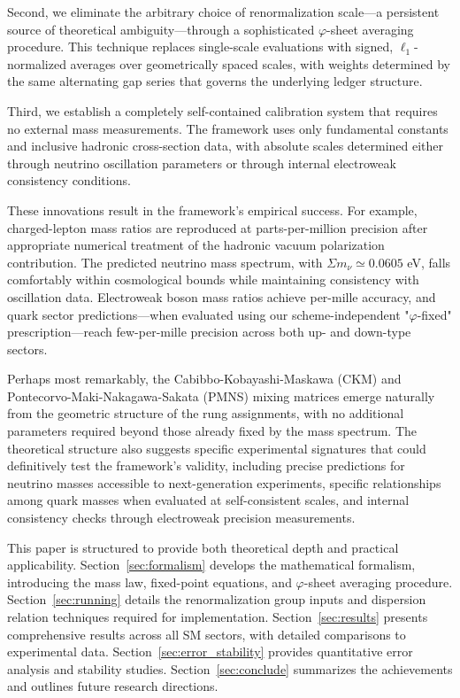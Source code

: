 \documentclass[%
amsmath,amssymb,
aps,
prb,
floatfix, showkeys, 10pt,
]{revtex4-2}
\begin{document}
Second, we eliminate the arbitrary choice of renormalization scale—a persistent source of theoretical ambiguity—through a sophisticated $\varphi$-sheet averaging procedure. This technique replaces single-scale evaluations with signed, $\ell_1$-normalized averages over geometrically spaced scales, with weights determined by the same alternating gap series that governs the underlying ledger structure.

Third, we establish a completely self-contained calibration system that requires no external mass measurements. The framework uses only fundamental constants and inclusive hadronic cross-section data, with absolute scales determined either through neutrino oscillation parameters or through internal electroweak consistency conditions.

These innovations result in the framework's empirical success. For example, charged-lepton mass ratios are reproduced at parts-per-million precision after appropriate numerical treatment of the hadronic vacuum polarization contribution. The predicted neutrino mass spectrum, with $\Sigma m_\nu \simeq 0.0605$ eV, falls comfortably within cosmological bounds while maintaining consistency with oscillation data. Electroweak boson mass ratios achieve per-mille accuracy, and quark sector predictions—when evaluated using our scheme-independent "$\varphi$-fixed" prescription—reach few-per-mille precision across both up- and down-type sectors.

Perhaps most remarkably, the Cabibbo-Kobayashi-Maskawa (CKM) and Pontecorvo-Maki-Nakagawa-Sakata (PMNS) mixing matrices emerge naturally from the geometric structure of the rung assignments, with no additional parameters required beyond those already fixed by the mass spectrum.
The theoretical structure also suggests specific experimental signatures that could definitively test the framework's validity, including precise predictions for neutrino masses accessible to next-generation experiments, specific relationships among quark masses when evaluated at self-consistent scales, and internal consistency checks through electroweak precision measurements.



This paper is structured to provide both theoretical depth and practical applicability. Section~\ref{sec:formalism} develops the mathematical formalism, introducing the mass law, fixed-point equations, and $\varphi$-sheet averaging procedure. Section~\ref{sec:running} details the renormalization group inputs and dispersion relation techniques required for implementation. Section~\ref{sec:results} presents comprehensive results across all SM sectors, with detailed comparisons to experimental data. Section~\ref{sec:error_stability} provides quantitative error analysis and stability studies. Section~\ref{sec:conclude} summarizes the achievements and outlines future research directions.
\end{document}
